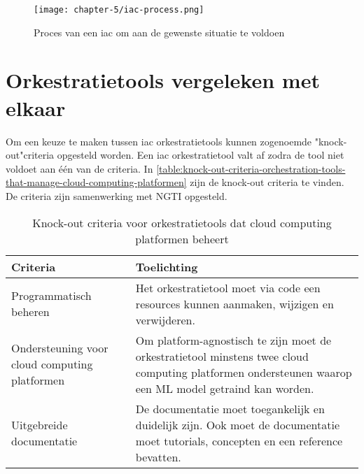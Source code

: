 \begin{figure}[hbt!]
  \centering
  \texttt{[image: chapter-5/iac-process.png]}
  \caption{Proces van een \acrfull{iac} om aan de gewenste situatie te voldoen}
  \label{fig:ch5-iac-process}
\end{figure}

\section{Orkestratietools vergeleken met elkaar}\label{subsec:ch5-orkestratietools-vergeleken-met-elkaar}
Om een keuze te maken tussen \acrshort{iac} orkestratietools kunnen zogenoemde "knock-out"\space criteria opgesteld worden. Een \acrshort{iac} orkestratietool valt af zodra de tool niet voldoet aan één van de criteria. In \autoref{table:knock-out-criteria-orchestration-tools-that-manage-cloud-computing-platformen} zijn de knock-out criteria te vinden. De criteria zijn samenwerking met NGTI opgesteld. 

\begin{table}[hbt!]
  \centering
  \caption{Knock-out criteria voor orkestratietools dat cloud computing platformen beheert}
  \vspace*{.5\baselineskip}
  \begin{tabular}{|p{.2\linewidth}|p{.69\linewidth}|}
  \hline
  \textbf{Criteria} & \textbf{Toelichting} \\ \hline
    Programmatisch beheren
    &
    Het orkestratietool moet via code een resources kunnen aanmaken, wijzigen en verwijderen. 
    \\ \hline

    Ondersteuning voor cloud \newline computing \newline platformen
    &
    Om platform-agnostisch te zijn moet de orkestratietool minstens twee cloud computing platformen ondersteunen waarop een ML model getraind kan worden.
    \\ \hline

    Uitgebreide \newline documentatie
    &
    De documentatie moet toegankelijk en duidelijk zijn. Ook moet de documentatie moet tutorials, concepten en een reference bevatten.
    \\ \hline
  \end{tabular}
  \label{table:knock-out-criteria-orchestration-tools-that-manage-cloud-computing-platformen}
\end{table}

